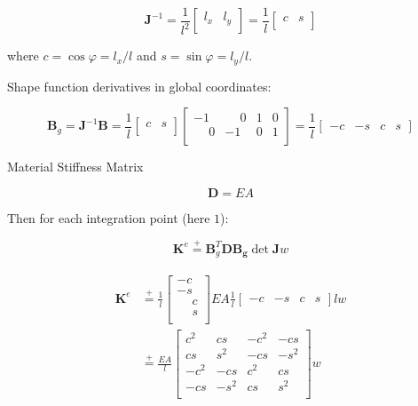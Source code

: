 \documentclass[10pt,b5paper,titlepage]{book}
\newcommand{\m}{\mathbf}
\newcommand*\eqp{\stackrel{+}{=}}
\newenvironment{eqarray}
{
    \begin{eqnarray}
        \begin{aligned}
}
{
        \end{aligned}
    \end{eqnarray}
}
\begin{document}
\begin{equation}
    \m{J}^{-1} = \frac{1}{l^2}
    \begin{bmatrix}
        l_x & l_y \\
    \end{bmatrix}
    = \frac{1}{l}
    \begin{bmatrix}
        c & s \\
    \end{bmatrix}
\end{equation}

where $ c = \cos \varphi = l_x / l $ and $ s = \sin \varphi = l_y / l $.

Shape function derivatives in global coordinates:

\begin{equation}
    \m{B}_g
    = \m{J}^{-1} \m{B}
    = \frac{1}{l}
    \begin{bmatrix}
        c & s \\
    \end{bmatrix}
    \begin{bmatrix}
        -1 & \phantom{-}0 & 1 & 0 \\
        \phantom{-}0 & -1 & 0 & 1  \\
    \end{bmatrix}
    = \frac{1}{l}
    \begin{bmatrix}
        -c & -s & c & s
    \end{bmatrix}
\end{equation}

Material Stiffness Matrix

\begin{equation}
    \m{D} = EA
\end{equation}

Then for each integration point (here $1$):

\begin{equation}
    \m{K}^e \eqp \m{B}_g^T \m{D} \m{B_g} \det \m{J} w
\end{equation}

\begin{eqarray}
    \m{K}^e &\eqp
    \frac{1}{l}
    \begin{bmatrix}
        -c \\
        -s \\
        \phantom{-}c \\
        \phantom{-}s \\
    \end{bmatrix}
    EA
    \frac{1}{l}
    \begin{bmatrix}
        -c & -s & c & s
    \end{bmatrix}
    l w \\
    &\eqp
    \frac{EA}{l}
    \begin{bmatrix}
        c^2 & c s & -c^2 & -cs \\
        cs & s^2 & -cs & -s^2 \\
        -c^2 & -c s & c^2 & cs \\
        -cs & -s^2 & cs & s^2 \\
    \end{bmatrix} w
\end{eqarray}
\end{document}
